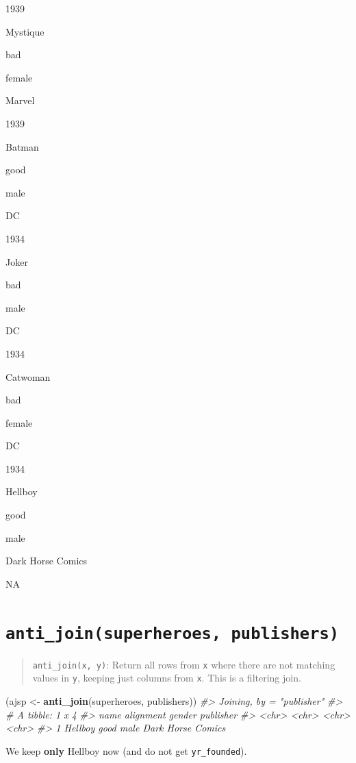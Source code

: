 \documentclass[
]{book}
\newenvironment{Shaded}{\begin{snugshade}}{\end{snugshade}}
\newcommand{\CommentTok}[1]{\textcolor[rgb]{0.56,0.35,0.01}{\textit{#1}}}
\newcommand{\KeywordTok}[1]{\textcolor[rgb]{0.13,0.29,0.53}{\textbf{#1}}}
\newcommand{\NormalTok}[1]{#1}
\newcommand{\StringTok}[1]{\textcolor[rgb]{0.31,0.60,0.02}{#1}}
\begin{document}
1939

Mystique

bad

female

Marvel

1939

Batman

good

male

DC

1934

Joker

bad

male

DC

1934

Catwoman

bad

female

DC

1934

Hellboy

good

male

Dark Horse Comics

NA

\hypertarget{anti_joinsuperheroes-publishers}{%
\section{\texorpdfstring{\texttt{anti\_join(superheroes,\ publishers)}}{anti\_join(superheroes, publishers)}}\label{anti_joinsuperheroes-publishers}}

\begin{quote}
\texttt{anti\_join(x,\ y)}: Return all rows from \texttt{x} where there are not matching values in \texttt{y}, keeping just columns from \texttt{x}. This is a filtering join.
\end{quote}

\begin{Shaded}
\begin{Highlighting}[]
\NormalTok{(ajsp <-}\StringTok{ }\KeywordTok{anti_join}\NormalTok{(superheroes, publishers))}
\CommentTok{#> Joining, by = "publisher"}
\CommentTok{#> # A tibble: 1 x 4}
\CommentTok{#>   name    alignment gender publisher        }
\CommentTok{#>   <chr>   <chr>     <chr>  <chr>            }
\CommentTok{#> 1 Hellboy good      male   Dark Horse Comics}
\end{Highlighting}
\end{Shaded}

We keep \textbf{only} Hellboy now (and do not get \texttt{yr\_founded}).
\end{document}
